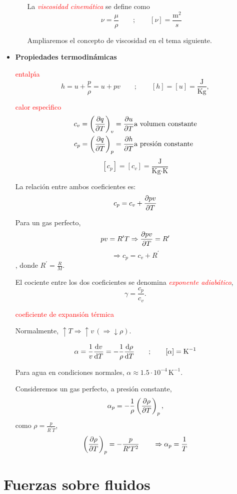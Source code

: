 \begin{itemize}
\begin{itemize}
		
		La \textit{\textcolor{red}{viscosidad cinem\'atica}} se define como
		$$
		\nu = \frac{\mu}{\rho} \qquad ; \qquad \left[\nu\right] = \frac{\textrm{m}^2}{s}
		$$
		
		Ampliaremos el concepto de viscosidad en el tema siguiente.
		
	\end{itemize}
	\item {\textbf{Propiedades termodin\'amicas}}
	
	\textcolor{red}{entalp\'{\i}a}
	$$ h = u + \frac{p}{\rho} = u + p v \qquad ; \qquad \left[h\right] = \left[u\right] = \frac{\textrm{J}}{\textrm{Kg}},
	$$
	
	\textcolor{red}{calor espec\'{\i}fico}
	\begin{eqnarray*}
		c_v = \left(\frac{\partial q}{\partial T}\right)_v = \frac{\partial u}{\partial T} & \textrm{a volumen constante} \\
		c_p = \left(\frac{\partial q}{\partial T}\right)_p = \frac{\partial h}{\partial T} & \textrm{a presi\'on constante}
	\end{eqnarray*}
	$$
	\left[ c_p \right] = \left[ c_v \right] = \frac{\textrm{J}}{\textrm{Kg}\cdot\textrm{K}}
	$$
	
	La relaci\'on entre ambos coeficientes es:
	$$
	c_p = c_v + \frac{\partial p v}{\partial T}
	$$
	
	Para un gas perfecto,
	$$ pv = R^\prime T  \Rightarrow \frac{\partial pv}{\partial T} = R^\prime $$
	$$ \Rightarrow c_p = c_v + R^\prime $$,
	donde $R^\prime = \frac{R}{M}$.
	
	El cociente entre los dos coeficientes se denomina \textit{\textcolor{red}{exponente adiab\'atico}},
	$$
	\gamma = \frac{c_p}{c_v}.
	$$
	
	\textcolor{red}{coeficiente de expansi\'on t\'ermica}
	
	Normalmente,  $\uparrow T \Rightarrow \uparrow v \, (\Rightarrow \downarrow \rho)$.
	
	$$
	\alpha = \frac{1}{v}\frac{\textrm{d} v}{\textrm{d} T} = - \frac{1}{\rho} \frac{\textrm{d} \rho}{\textrm{d} T} \qquad; \qquad \left[ \alpha \right] = \textrm{K}^{-1}
	$$
	
	Para agua en condiciones normales, $\alpha \approx 1.5\cdot10^{-4} \,\textrm{K}^{-1}$.
	
	Consideremos un gas perfecto, a presi\'on constante,
	$$
	\alpha_p = -\frac{1}{\rho}\left( \frac{\partial \rho}{\partial T}\right)_p,
	$$
	como $\rho = \frac{p}{R^\prime T}$,
	$$\left(\frac{\partial \rho}{\partial T}\right)_p = -\frac{p}{R^\prime T^2} \qquad \Rightarrow \alpha_p = \frac{1}{T}$$	
\end{itemize}

\section{Fuerzas sobre fluidos}
